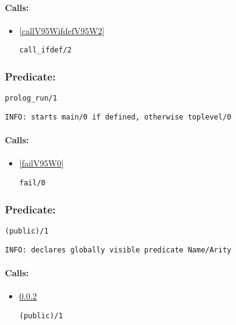 \paragraph{Calls:} 
\begin{itemize}
\item \ref{callV95WifdefV95W2} 
\begin{verbatim}
call_ifdef/2
\end{verbatim}

\end{itemize}

\subsubsection{Predicate:} \label{prologV95WrunV95W1}

\begin{verbatim}
prolog_run/1
\end{verbatim}

{\small \begin{verbatim}
INFO: starts main/0 if defined, otherwise toplevel/0

\end{verbatim}}
\paragraph{Calls:} 
\begin{itemize}
\item \ref{failV95W0} 
\begin{verbatim}
fail/0
\end{verbatim}

\end{itemize}

\subsubsection{Predicate:} \label{publicV95W1}

\begin{verbatim}
(public)/1
\end{verbatim}

{\small \begin{verbatim}
INFO: declares globally visible predicate Name/Arity

\end{verbatim}}
\paragraph{Calls:} 
\begin{itemize}
\item \ref{publicV95W1} 
\begin{verbatim}
(public)/1
\end{verbatim}

\end{itemize}
